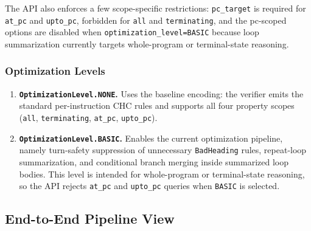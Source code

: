 The API also enforces a few scope-specific restrictions: \texttt{pc\_target} is required for \texttt{at\_pc} and \texttt{upto\_pc}, forbidden for \texttt{all} and \texttt{terminating}, and the pc-scoped options are disabled when \texttt{optimization\_level=BASIC} because loop summarization currently targets whole-program or terminal-state reasoning.

\subsubsection*{Optimization Levels}
\begin{enumerate}[leftmargin=1.5em, itemsep=4pt, topsep=4pt]
    \item \textbf{\texttt{OptimizationLevel.NONE}.} Uses the baseline encoding: the verifier emits the standard per-instruction CHC rules and supports all four property scopes (\texttt{all}, \texttt{terminating}, \texttt{at\_pc}, \texttt{upto\_pc}).
    \item \textbf{\texttt{OptimizationLevel.BASIC}.} Enables the current optimization pipeline, namely turn-safety suppression of unnecessary \texttt{BadHeading} rules, repeat-loop summarization, and conditional branch merging inside summarized loop bodies. This level is intended for whole-program or terminal-state reasoning, so the API rejects \texttt{at\_pc} and \texttt{upto\_pc} queries when \texttt{BASIC} is selected.
\end{enumerate}

\subsection*{End-to-End Pipeline View}

